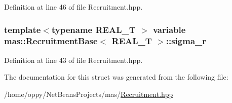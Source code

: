 Definition at line 46 of file Recruitment.\-hpp.

\hypertarget{structmas_1_1_recruitment_base_a17d973c0bbb663b2d836c9f5b1270b9b}{
\subsubsection[{sigma\-\_\-r}]{\setlength{\rightskip}{0pt plus 5cm}template$<$typename R\-E\-A\-L\-\_\-\-T $>$ {\bf variable} {\bf mas\-::\-Recruitment\-Base}$<$ R\-E\-A\-L\-\_\-\-T $>$\-::sigma\-\_\-r}}\label{structmas_1_1_recruitment_base_a17d973c0bbb663b2d836c9f5b1270b9b}


Definition at line 43 of file Recruitment.\-hpp.



The documentation for this struct was generated from the following file\-:\begin{DoxyCompactItemize}
\item 
/home/oppy/\-Net\-Beans\-Projects/mas/\hyperlink{_recruitment_8hpp}{Recruitment.\-hpp}\end{DoxyCompactItemize}
